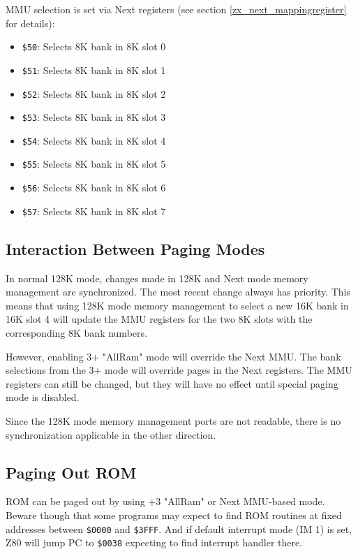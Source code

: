\documentclass[twoside,openright,a4paper]{book}
\begin{document}
MMU selection is set via Next registers (see section \ref{zx_next_mappingregister} for details):

\begin{itemize}
	\item {\tt \$50}: Selects 8K bank in 8K slot 0
	\item {\tt \$51}: Selects 8K bank in 8K slot 1
	\item {\tt \$52}: Selects 8K bank in 8K slot 2
	\item {\tt \$53}: Selects 8K bank in 8K slot 3
	\item {\tt \$54}: Selects 8K bank in 8K slot 4
	\item {\tt \$55}: Selects 8K bank in 8K slot 5
	\item {\tt \$56}: Selects 8K bank in 8K slot 6
	\item {\tt \$57}: Selects 8K bank in 8K slot 7
\end{itemize}


\subsection{Interaction Between Paging Modes}

In normal 128K mode, changes made in 128K and Next mode memory management are synchronized. The most recent change always has priority. This means that using 128K mode memory management to select a new 16K bank in 16K slot 4 will update the MMU registers for the two 8K slots with the corresponding 8K bank numbers.

However, enabling 3+ "AllRam" mode will override the Next MMU. The bank selections from the 3+ mode will override pages in the Next registers. The MMU registers can still be changed, but they will have no effect until special paging mode is disabled.

Since the 128K mode memory management ports are not readable, there is no synchronization applicable in the other direction.


\subsection{Paging Out ROM}

ROM can be paged out by using +3 "AllRam" or Next MMU-based mode. Beware though that some programs may expect to find ROM routines at fixed addresses between {\tt \$0000} and {\tt \$3FFF}. And if default interrupt mode (IM 1) is set, Z80 will jump PC to {\tt \$0038} expecting to find interrupt handler there.
\end{document}
